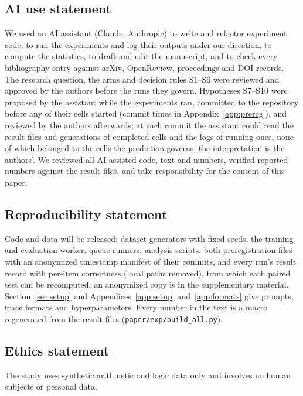 \documentclass{article}
\theoremstyle{definition}
\begin{document}
\subsection*{AI use statement}
We used an AI assistant (Claude, Anthropic) to write and refactor experiment code, to run the experiments and log their outputs under our direction, to compute the statistics, to draft and edit the manuscript, and to check every bibliography entry against arXiv, OpenReview, proceedings and DOI records. The research question, the arms and decision rules S1--S6 were reviewed and approved by the authors before the runs they govern. Hypotheses S7--S10 were proposed by the assistant while the experiments ran, committed to the repository before any of their cells started (commit times in Appendix~\ref{app:prereg}), and reviewed by the authors afterwards; at each commit the assistant could read the result files and generations of completed cells and the logs of running ones, none of which belonged to the cells the prediction governs; the interpretation is the authors'. We reviewed all AI-assisted code, text and numbers, verified reported numbers against the result files, and take responsibility for the content of this paper.

\subsection*{Reproducibility statement}
Code and data will be released: dataset generators with fixed seeds, the training and evaluation worker, queue runners, analysis scripts, both preregistration files with an anonymized timestamp manifest of their commits, and every run's result record with per-item correctness (local paths removed), from which each paired test can be recomputed; an anonymized copy is in the supplementary material. Section~\ref{sec:setup} and Appendices~\ref{app:setup} and~\ref{app:formats} give prompts, trace formats and hyperparameters. Every number in the text is a macro regenerated from the result files (\texttt{paper/exp/build\_all.py}).

\subsection*{Ethics statement}
The study uses synthetic arithmetic and logic data only and involves no human subjects or personal data.




\appendix
\end{document}
